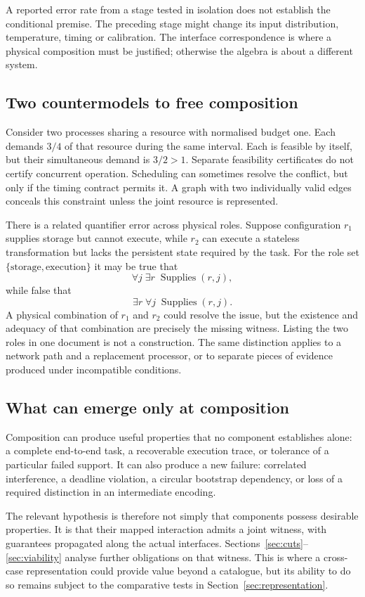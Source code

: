\documentclass[11pt,a4paper]{article}
\theoremstyle{definition}
\theoremstyle{remark}
\begin{document}
A reported error rate from a stage tested in isolation does not establish the conditional premise. The preceding stage might change its input distribution, temperature, timing or calibration. The interface correspondence is where a physical composition must be justified; otherwise the algebra is about a different system.

\subsection{Two countermodels to free composition}
Consider two processes sharing a resource with normalised budget one. Each demands $3/4$ of that resource during the same interval. Each is feasible by itself, but their simultaneous demand is $3/2>1$. Separate feasibility certificates do not certify concurrent operation. Scheduling can sometimes resolve the conflict, but only if the timing contract permits it. A graph with two individually valid edges conceals this constraint unless the joint resource is represented.

There is a related quantifier error across physical roles. Suppose configuration $r_1$ supplies storage but cannot execute, while $r_2$ can execute a stateless transformation but lacks the persistent state required by the task. For the role set $\{\text{storage},\text{execution}\}$ it may be true that
\[
 \forall j\;\exists r\;\operatorname{Supplies}(r,j),
\]
while false that
\[
 \exists r\;\forall j\;\operatorname{Supplies}(r,j).
\]
A physical combination of $r_1$ and $r_2$ could resolve the issue, but the existence and adequacy of that combination are precisely the missing witness. Listing the two roles in one document is not a construction. The same distinction applies to a network path and a replacement processor, or to separate pieces of evidence produced under incompatible conditions.

\subsection{What can emerge only at composition}
Composition can produce useful properties that no component establishes alone: a complete end-to-end task, a recoverable execution trace, or tolerance of a particular failed support. It can also produce a new failure: correlated interference, a deadline violation, a circular bootstrap dependency, or loss of a required distinction in an intermediate encoding.

The relevant hypothesis is therefore not simply that components possess desirable properties. It is that their mapped interaction admits a joint witness, with guarantees propagated along the actual interfaces. Sections~\ref{sec:cuts}--\ref{sec:viability} analyse further obligations on that witness. This is where a cross-case representation could provide value beyond a catalogue, but its ability to do so remains subject to the comparative tests in Section~\ref{sec:representation}.
\end{document}
